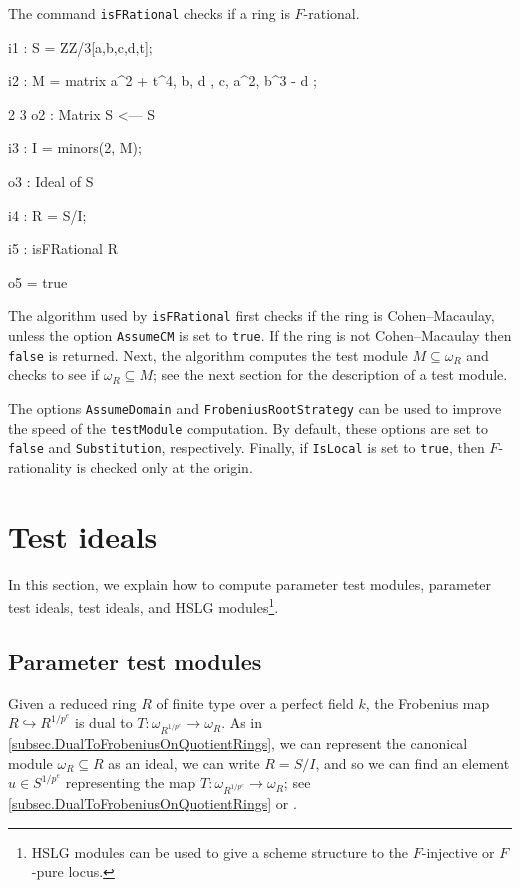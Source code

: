 \documentclass{amsart}
\begin{document}
The command \texttt{isFRational} checks if a ring is $F$-rational.

\medskip
{\small{}
\begin{MyVerbatim}
i1 : S = ZZ/3[a,b,c,d,t];

i2 : M = matrix{{ a^2 + t^4, b, d }, { c, a^2, b^3 - d }};

             2       3
o2 : Matrix S  <--- S

i3 : I = minors(2, M);

o3 : Ideal of S

i4 : R = S/I;

i5 : isFRational R

o5 = true
\end{MyVerbatim}
}\medskip

The algorithm used by \texttt{isFRational} first checks if the ring is Cohen--Macaulay, unless the option \texttt{AssumeCM} is set to \texttt{true}. If the ring
is not Cohen--Macaulay then \texttt{false} is returned. Next, the algorithm
computes the test module $M \subseteq \omega_{R}$ and checks to see if
$\omega_{R} \subseteq M$;  see the next section for the description of a test module.


The options \texttt{AssumeDomain} and \texttt{FrobeniusRootStrategy} can be
used to improve the speed of the \texttt{testModule} computation. By default,
these options are set to \texttt{false} and \texttt{Substitution}, respectively.
Finally, if \texttt{IsLocal} is set to \texttt{true}, then $F$-rationality is checked only at the origin.


\section{Test ideals}\label{Section: Test Ideals}

In this section, we explain how to compute parameter test modules, parameter test ideals, test ideals, and HSLG modules\footnote{HSLG modules can be used to give a scheme structure to the $F$-injective or $F$-pure locus.}.

\subsection{Parameter test modules}
%
%
Given a reduced ring $R$ of finite type over a perfect field $k$, the Frobenius map $R \hookrightarrow R^{1/p^e}$ is dual to $T : \omega_{R^{1/p^e}} \to \omega_R$.  As in \autoref{subsec.DualToFrobeniusOnQuotientRings}, we can represent the canonical module $\omega_R \subseteq R$ as an ideal, we can write $R = S/I$, and so we can find an element $u \in S^{1/p^e}$ representing the map $T:\omega_{R^{1/p^e}} \to \omega_R$; see \autoref{subsec.DualToFrobeniusOnQuotientRings} or \cite{KatzmanParameterTestIdealOfCMRings}.
\end{document}
